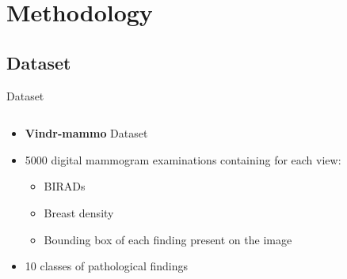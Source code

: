 \section{Methodology}


\subsection{Dataset}
\begin{frame}{Dataset}
    \begin{columns}
        \begin{column}{0.5\textwidth}
            \begin{itemize}
                \item \textbf{Vindr-mammo} Dataset 
                \item \num{5000} digital mammogram examinations containing for each view:
                \begin{itemize}
                    \item BIRADs
                    \item Breast density
                    \item Bounding box of each finding present on the image
                \end{itemize}
                \item 10 classes of pathological findings
            \end{itemize}
        \end{column}


\end{columns}
\end{frame}
